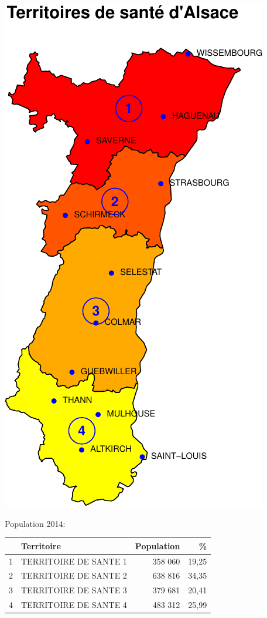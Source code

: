 \documentclass[]{article}
\begin{document}
\begin{center}\includegraphics{Figs/unnamed-chunk-43-1} \end{center}

Population 2014:

\begin{table}[ht]
\centering
\begin{tabular}{rlrr}
  \hline
 & Territoire & Population & \% \\ 
  \hline
1 & TERRITOIRE DE SANTE 1 & 358 060 & 19,25 \\ 
  2 & TERRITOIRE DE SANTE 2 & 638 816 & 34,35 \\ 
  3 & TERRITOIRE DE SANTE 3 & 379 681 & 20,41 \\ 
  4 & TERRITOIRE DE SANTE 4 & 483 312 & 25,99 \\ 
   \hline
\end{tabular}
\end{table}
\end{document}
